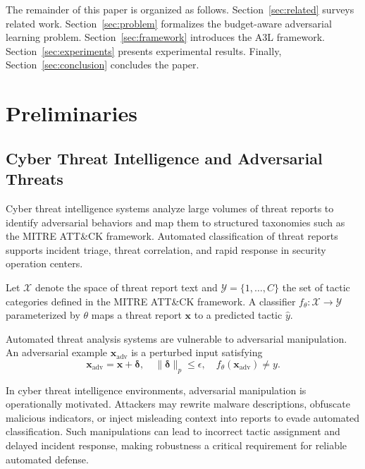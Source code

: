 \documentclass[review,1p,times,number]{elsarticle}
\newcommand{\xadv}{\mathbf{x}_{\mathrm{adv}}}
\begin{document}
The remainder of this paper is organized as follows.
Section~\ref{sec:related} surveys related work.
Section~\ref{sec:problem} formalizes the budget-aware adversarial learning
problem.
Section~\ref{sec:framework} introduces the A3L framework.
Section~\ref{sec:experiments} presents experimental results.
Finally, Section~\ref{sec:conclusion} concludes the paper.
\iffalse

\section{Preliminaries}
\label{sec:background}

\subsection{Cyber Threat Intelligence and Adversarial Threats}
\label{subsec:cti}

Cyber threat intelligence systems analyze large volumes of threat
reports to identify adversarial behaviors and map them to structured
taxonomies such as the MITRE ATT\&CK framework. Automated
classification of threat reports supports incident triage, threat
correlation, and rapid response in security operation centers.

Let $\mathcal{X}$ denote the space of threat report text and
$\mathcal{Y} = \{1,\ldots,C\}$ the set of tactic categories defined
in the MITRE ATT\&CK framework. A classifier
$f_\theta : \mathcal{X} \rightarrow \mathcal{Y}$ parameterized by
$\theta$ maps a threat report $\mathbf{x}$ to a predicted tactic
$\hat{y}$.

Automated threat analysis systems are vulnerable to adversarial
manipulation. An adversarial example $\xadv$ is a perturbed input
satisfying
\begin{equation}
\xadv = \mathbf{x} + \boldsymbol{\delta}, \quad
\|\boldsymbol{\delta}\|_p \leq \epsilon, \quad
f_\theta(\xadv) \neq y .
\label{eq:adv_def}
\end{equation}

In cyber threat intelligence environments, adversarial manipulation
is operationally motivated. Attackers may rewrite malware
descriptions, obfuscate malicious indicators, or inject misleading
context into reports to evade automated classification. Such
manipulations can lead to incorrect tactic assignment and delayed
incident response, making robustness a critical requirement for
reliable automated defense.
\end{document}
